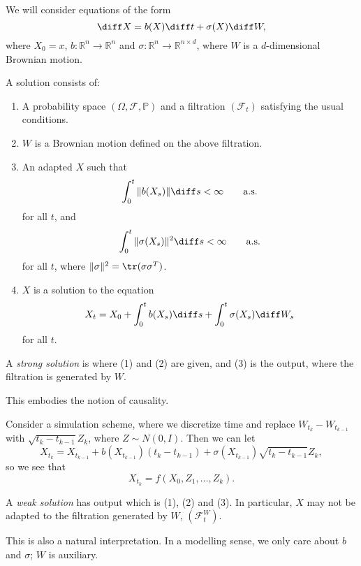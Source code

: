 \documentclass[12pt]{article}
\begin{document}
We will consider equations of the form
\[
\diff X = b(X) \diff t + \sigma(X) \diff W,
\]
where $X_0 = x$, $b : \mathbb{R}^{n} \to \mathbb{R}^{n}$ and $\sigma : \mathbb{R}^{n} \to \mathbb{R}^{n \times d}$, where $W$ is a $d$-dimensional Brownian motion.

A solution consists of:
\begin{enumerate}[(1)]
	\item A probability space $(\Omega, \mathcal{F}, \mathbb{P})$ and a filtration $(\mathcal{F}_t)$ satisfying the usual conditions.
	\item $W$ is a Brownian motion defined on the above filtration.
	\item An adapted $X$ such that
		\[
			\int_0^{t} \|b (X_s)\| \diff s < \infty \qquad\text{a.s.}
		\]
		for all $t$, and
		\[
			\int_0^{t} \|\sigma(X_s)\|^2 \diff s < \infty \qquad\text{a.s.}
		\]
		for all $t$, where $\|\sigma\|^2 = \tr(\sigma \sigma^{T})$.
	\item $X$ is a solution to the equation
		\[
		X_t = X_0 + \int_0^{t} b(X_s) \diff s + \int_0^{t} \sigma(X_s) \diff W_s
		\]
		for all $t$.
\end{enumerate}

\begin{definition}
	A \emph{strong solution} is where (1) and (2) are given, and (3) is the output, where the filtration is generated by $W$.
\end{definition}

This embodies the notion of causality.

\begin{remark}
	Consider a simulation scheme, where we discretize time and replace $W_{t_k} - W_{t_{k-1}}$ with $\sqrt{t_k - t_{k-1}} Z_k$, where $Z \sim N(0, I)$. Then we can let
	\[
		X_{t_k} = X_{t_{k-1}} + b(X_{t_{k-1}}) (t_k - t_{k-1}) + \sigma(X_{t_{k-1}}) \sqrt{t_k - t_{k-1}} Z_k,
	\]
	so we see that
	\[
	X_{t_k} = f(X_0, Z_1, \ldots, Z_k).
	\]
\end{remark}

\begin{definition}
	A \emph{weak solution} has output which is (1), (2) and (3). In particular, $X$ may not be adapted to the filtration generated by $W$, $(\mathcal{F}_t^{W})$.
\end{definition}

\begin{remark}
	This is also a natural interpretation. In a modelling sense, we only care about $b$ and $\sigma$; $W$ is auxiliary.
\end{remark}
\end{document}
